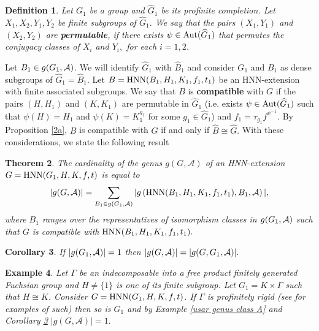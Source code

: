 \documentclass[a4paper,12pt]{article}
\newtheorem{thm}{Theorem}[section]
\newtheorem{cor}[thm]{Corollary}
\newtheorem{deff}[thm]{Definition}
\newcommand{\A}{{\cal A}}
\def\aut {{\rm Aut}}
\def\hnn {{\rm HNN}}
\newtheorem{exa}[thm]{Example}
\begin{document}
{ \begin{deff} Let $G_1$ be a group and $\widehat G_1$ be its profinite completion. Let $X_1, X_2, Y_1, Y_2$ be finite subgroups of $\widehat G_1$. We say that the pairs $(X_1,Y_1)$ and $(X_2,Y_2)$ are \textbf{permutable}, if there exists $\psi\in\aut(\widehat G_1)$ that  permutes the conjugacy classes of $X_i$ and $Y_i,$ for each  $i=1,2$.\end{deff} 
 
Let $B_1 \in g(G_1,\A)$. We will identify $\widehat G_1$ with $\widehat B_1$ and consider $G_1$ and $B_1$ as dense subgroups of $\widehat G_1=\widehat B_1.$ 
  Let $B=\hnn(B_1,H_1,K_1,f_1,t_1)$ be an HNN-extension with finite associated subgroups. We say that $B$ is \textbf{ compatible }  with $G$ if the pairs $(H,H_1)$ and $(K,K_1)$ are permutable in $\widehat G_1$ (i.e. exists $\psi\in\aut(\widehat G_1)$ such that $\psi(H)=H_1$ and $\psi(K)=K_1^{g_1}$ for some $g_1\in \widehat G_1$) and $f_1 = \tau_{g_1} f^{\psi^{-1}}$.
By Proposition \ref{2a}, $B$ is compatible with $G$ if and only if $\widehat B\cong \widehat G.$ 
With these considerations, we state the following result


\begin{thm}\label{fixed H2} The cardinality of the genus $g(G, \mathcal{A})$ of an HNN-extension $G=\hnn(G_1, H, K, f, t)$ is equal to $$|g(G,\A)| = \sum_{B_1\in g(G_1,\A)} |g\left(\hnn(B_1, H_1, K_1, f_1, t_1  ), B_1,\A\right)|,$$ where $B_1$ ranges over the representatives of isomorphism classes in $g(G_1,\A)$ such that $G$ is compatible with $\hnn(B_1, H_1, K_1, f_1, t_1 ).$   
\end{thm}




\begin{cor} \label{genus 1 gerall}
If $| g(G_1,\A)|=1$ then $|g(G, \mathcal{A})|=|g(G, G_1,\A)|.$    
\end{cor}

\begin{exa} 
 Let $\Gamma$ be an indecomposable into a free product finitely generated  Fuchsian group and $H \neq \{1\}$ is one of its finite subgroup. Let $G_1=K\times \Gamma$ such that $H \cong K$. Consider $G=\hnn(G_1,H, K, f, t)$. If $\Gamma$ is profinitely rigid (see \cite{BMRS20} for examples of such) then so is $G_1$ and by Example \ref{usar genus class A} and Corollary \ref{genus 1 gerall}  $|g(G,\mathcal{A})|=1.$  
\end{exa}






}
\end{document}
